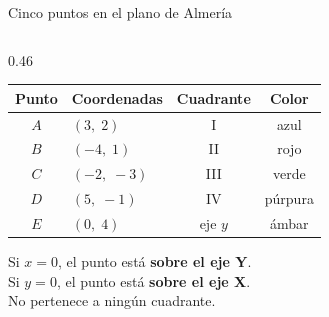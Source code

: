 \documentclass[aspectratio=169, 10pt, spanish]{beamer}
\begin{document}
\begin{frame}{Cinco puntos en el plano de Almería}
\begin{columns}[c]
    \begin{column}{0.46\textwidth}
      \vspace{4pt}
      {\AlmFontSmall
      \begin{tabular}{@{}clcc@{}}
        \toprule
        \textbf{Punto} & \textbf{Coordenadas}
          & \textbf{Cuadrante} & \textbf{Color}\\
        \midrule
        $A$ & $(3,\;2)$    & I   & \textcolor{AlmAzulM}{azul}\\
        $B$ & $(-4,\;1)$   & II  & \textcolor{AlmTerra}{rojo}\\
        $C$ & $(-2,\;-3)$  & III & \textcolor{AlmVerde}{verde}\\
        $D$ & $(5,\;-1)$   & IV  & \textcolor{BCrear}{púrpura}\\
        $E$ & $(0,\;4)$    & eje $y$ & \textcolor{BAplicar!80!black}{ámbar}\\
        \bottomrule
      \end{tabular}}
      \vspace{8pt}
      \begin{notabox}
        \AlmFontFootnote
        Si $x = 0$, el punto está \textbf{sobre el eje Y}.\\
        Si $y = 0$, el punto está \textbf{sobre el eje X}.\\
        No pertenece a ningún cuadrante.
      \end{notabox}
    \end{column}
  \end{columns}
\end{frame}

\end{document}
